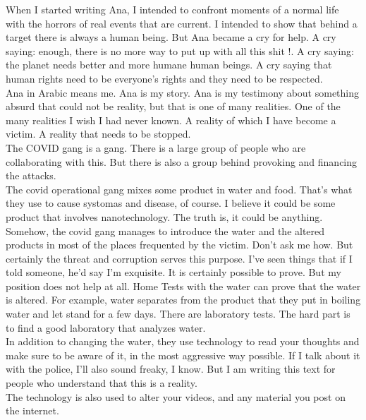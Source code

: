 \documentclass[11pt]{book}
\begin{document}
\noindent When I started writing Ana, I intended to confront moments of a normal life with the horrors of real events that are current. I intended to show that behind a target there is always a human being. But Ana became a cry for help. A cry saying: enough, there is no more way to put up with all this shit !. A cry saying: the planet needs better and more humane human beings. A cry saying that human rights need to be everyone's rights and they need to be respected. \\

\noindent Ana in Arabic means me. Ana is my story. Ana is my testimony about something absurd that could not be reality, but that is one of many realities. One of the many realities I wish I had never known. A reality of which I have become a victim. A reality that needs to be stopped. \\

\noindent The COVID gang is a gang. There is a large group of people who are collaborating with this. But there is also a group behind provoking and financing the attacks. \\

\noindent The covid operational gang mixes some product in water and food. That's what they use to cause systomas and disease, of course. I believe it could be some product that involves nanotechnology. The truth is, it could be anything. Somehow, the covid gang manages to introduce the water and the altered products in most of the places frequented by the victim. Don't ask me how. But certainly the threat and corruption serves this purpose. I've seen things that if I told someone, he'd say I'm exquisite. It is certainly possible to prove. But my position does not help at all. Home Tests with the water can prove that the water is altered. For example, water separates from the product that they put in boiling water and let stand for a few days. There are laboratory tests. The hard part is to find a good laboratory that analyzes water. \\

\noindent In addition to changing the water, they use technology to read your thoughts and make sure to be aware of it, in the most aggressive way possible. If I talk about it with the police, I'll also sound freaky, I know. But I am writing this text for people who understand that this is a reality. \\

\noindent The technology is also used to alter your videos, and any material you post on the internet. \\
\end{document}
